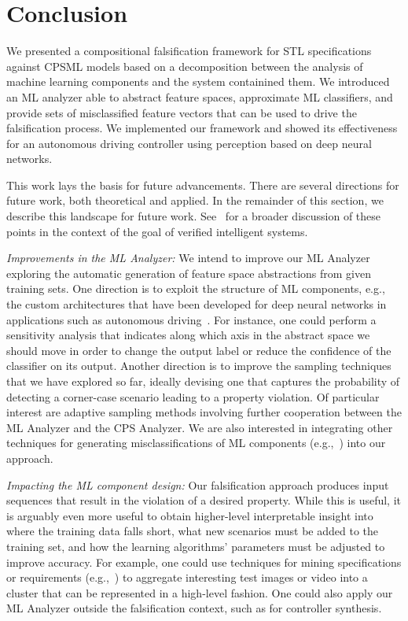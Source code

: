 \section{Conclusion}\label{sec:conclusion}

We presented a compositional falsification framework for STL specifications against CPSML models
based on a decomposition between the analysis of machine learning
components and the system containined them.
We introduced an ML
analyzer able to abstract feature spaces, approximate ML classifiers, 
and provide sets of misclassified feature vectors that can be used to drive the falsification process.
We implemented our framework and showed its effectiveness for an
autonomous driving controller using perception based on deep neural networks.

This work lays the basis for future advancements. There are several
directions for future work, both theoretical and applied. In the
remainder of this section, we describe this landscape for future work.
See~\cite{SeshiaS16} for a broader discussion of these points in
the context of the goal of verified intelligent systems.

\noindent
{\em Improvements in the ML Analyzer:} 
We intend to improve our ML Analyzer
exploring the automatic generation of feature space abstractions from given
training sets. One direction is to exploit the structure of ML
components, e.g., the custom architectures that have been
developed for deep neural networks in applications such as autonomous
driving~\cite{iandola2016squeezenet}.
For instance, one could perform a sensitivity analysis that 
indicates along which axis in the abstract
space we should move in order to change the output label or reduce
the confidence of the classifier on its output.
Another direction is to improve the sampling techniques
that we have explored so far, ideally devising one that
captures the probability of detecting a corner-case scenario leading
to a property violation. Of particular interest are adaptive sampling methods
involving further cooperation between the ML Analyzer and the CPS Analyzer. 
We are also interested in integrating other techniques
for generating misclassifications of ML components 
(e.g.,~\cite{moosavi2015deepfool,huang-arxiv16,carlini-ieeesp17})
into our approach.

\noindent
{\em Impacting the ML component design:}
Our falsification approach produces input sequences that result
in the violation of a desired property.
While this is useful, it is arguably even more useful to obtain higher-level
interpretable insight into where the training data falls short, what
new scenarios must be added to the training set, and how the 
learning algorithms' parameters must be adjusted to improve accuracy.
For example, one could use techniques for mining specifications
or requirements (e.g.,~\cite{jin-tcad15,vazquez-cav17}) 
to aggregate interesting test images or video
into a cluster that can be represented in a high-level fashion.
One could also apply our ML Analyzer outside the 
falsification context, such as for controller synthesis. 

